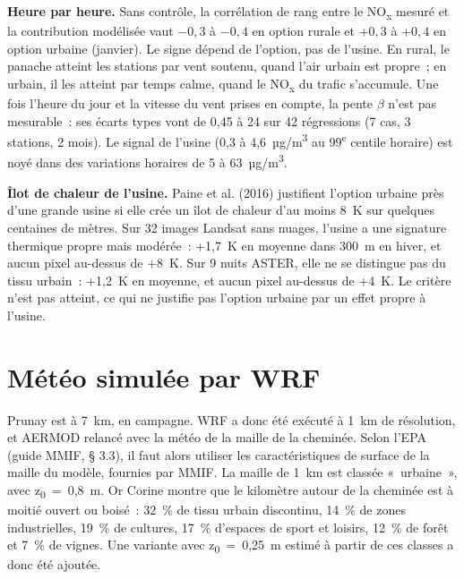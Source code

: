 \documentclass[11pt,a4paper]{article}
\newcommand{\NOx}{NO\textsubscript{x}}
\newcommand{\ugm}{µg/m\textsuperscript{3}}
\newcommand{\zz}{z\textsubscript{0}}
\begin{document}
\textbf{Heure par heure.} Sans contrôle, la corrélation de rang entre le \NOx{} mesuré et la contribution modélisée
vaut $-0{,}3$ à $-0{,}4$ en option rurale et $+0{,}3$ à $+0{,}4$ en option urbaine (janvier). Le signe dépend de
l'option, pas de l'usine. En rural, le panache atteint les stations par vent soutenu, quand l'air urbain est propre~;
en urbain, il les atteint par temps calme, quand le \NOx{} du trafic s'accumule. Une fois l'heure du jour et la
vitesse du vent prises en compte, la pente $\beta$ n'est pas mesurable~: ses écarts types vont de 0,45 à 24 sur
42 régressions (7 cas, 3 stations, 2 mois). Le signal de l'usine (0,3 à 4,6~\ugm{} au 99\textsuperscript{e}
centile horaire) est noyé dans des variations horaires de 5 à 63~\ugm.

\textbf{Îlot de chaleur de l'usine.} Paine et al. (2016) justifient l'option urbaine près d'une grande usine si elle
crée un îlot de chaleur d'au moins 8~K sur quelques centaines de mètres. Sur 32 images Landsat sans nuages, l'usine
a une signature thermique propre mais modérée~: +1,7~K en moyenne dans 300~m en hiver, et aucun pixel au-dessus de
+8~K. Sur 9 nuits ASTER, elle ne se distingue pas du tissu urbain~: +1,2~K en moyenne, et aucun pixel au-dessus de
+4~K. Le critère n'est pas atteint, ce qui ne justifie pas l'option urbaine par un effet propre à l'usine.

\section{Météo simulée par WRF}
Prunay est à 7~km, en campagne. WRF a donc été exécuté à 1~km de résolution, et AERMOD relancé avec la météo de la
maille de la cheminée. Selon l'EPA (guide MMIF, § 3.3), il faut alors utiliser les caractéristiques de surface de la
maille du modèle, fournies par MMIF. La maille de 1~km est classée «~urbaine~», avec \zz{}~=~0,8~m. Or Corine montre
que le kilomètre autour de la cheminée est à moitié ouvert ou boisé~: 32~\% de tissu urbain discontinu, 14~\% de
zones industrielles, 19~\% de cultures, 17~\% d'espaces de sport et loisirs, 12~\% de forêt et 7~\% de vignes. Une
variante avec \zz{}~=~0,25~m estimé à partir de ces classes a donc été ajoutée.
\end{document}
